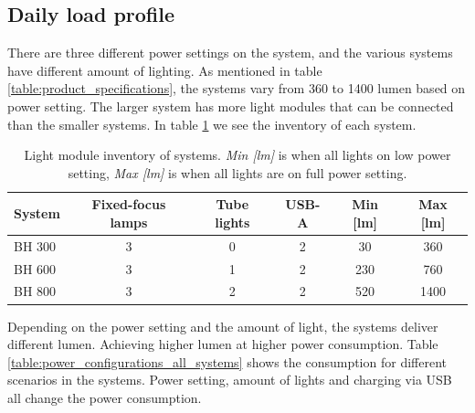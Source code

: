 \subsection{Daily load profile}
There are three different power settings on the system, and the various systems have different amount of lighting. As mentioned in table \ref{table:product_specifications}, the systems vary from 360 to 1400 lumen based on power setting. The larger system has more light modules that can be connected than the smaller systems. In table \ref{table:light_inventory} we see the inventory of each system. 

\begin{table}[h]
\centering
\begin{tabularx}{\textwidth}{|X|S[table-format=3.1]|S[table-format=3.1]|S[table-format=3.1]|S[table-format=3.1]|S[table-format=3.1]|}
\hline
\textbf{System} & \textbf{Fixed-focus lamps} & \textbf{Tube lights}  &\textbf{USB-A}& \textbf{Min [lm]} & \textbf{Max  [lm]} \\ \hline
BH 300                &               3              &          0    & 2     & 30    & 360 \\ \hline
BH 600                &              3                  &          1   & 2    &   230 & 760 \\ \hline
BH 800                &              3                  &         2    & 2    & 520  & 1400 \\ \hline
\end{tabularx}
\caption{Light module inventory of systems. \textit{Min [lm]} is when all lights on low power setting, \textit{Max [lm]} is when all lights are on full power setting.}
\label{table:light_inventory}
\end{table}

Depending on the power setting and the amount of light, the systems deliver different lumen. Achieving higher lumen at higher power consumption. Table \ref{table:power_configurations_all_systems} shows the consumption for different scenarios in the systems. Power setting, amount of lights and charging via USB all change the power consumption. 

